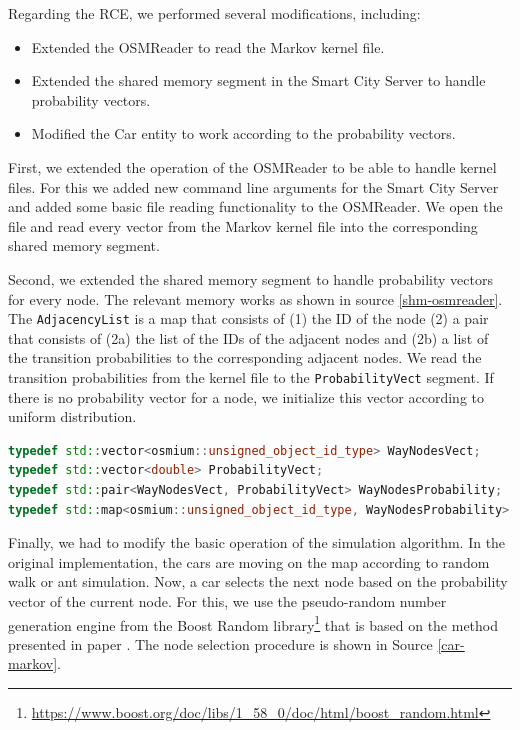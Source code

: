 \documentclass[b5paper,12pt]{report}
\theoremstyle{definition}
\begin{document}
Regarding the RCE, we performed several modifications, including:
\begin{itemize}
    \item Extended the OSMReader to read the Markov kernel file.
    \item Extended the shared memory segment in the Smart City Server to handle probability vectors.
    \item Modified the Car entity to work according to the probability vectors.
\end{itemize} 

First, we extended the operation of the OSMReader to be able to handle kernel files. For this we added new command line arguments for the Smart City Server and added some basic file reading functionality to the OSMReader. We open the file and read every vector from the Markov kernel file into the corresponding shared memory segment.

Second, we extended the shared memory segment to handle probability vectors for every node. The relevant memory works as shown in source \ref{shm-osmreader}. The \texttt{AdjacencyList} is a map that consists of (1) the ID of the node (2) a pair that consists of (2a) the list of the IDs of the adjacent nodes and (2b) a list of the transition probabilities to the corresponding adjacent nodes. We read the transition probabilities from the kernel file to the \texttt{ProbabilityVect} segment. If there is no probability vector for a node, we initialize this vector according to uniform distribution.

\begin{lstlisting}[language=C++,caption=The shared memory segment of a Markov traffic., label=shm-osmreader, escapechar={|}]
typedef std::vector<osmium::unsigned_object_id_type> WayNodesVect;
typedef std::vector<double> ProbabilityVect;
typedef std::pair<WayNodesVect, ProbabilityVect> WayNodesProbability;
typedef std::map<osmium::unsigned_object_id_type, WayNodesProbability> AdjacencyList;
\end{lstlisting}

Finally, we had to modify the basic operation of the simulation algorithm. In the original implementation, the cars are moving on the map according to random walk or ant simulation. Now, a car selects the next node based on the probability vector of the current node. For this, we use the pseudo-random number generation engine from the Boost Random library\footnote{\url{https://www.boost.org/doc/libs/1_58_0/doc/html/boost_random.html}} that is based on the method presented in paper \cite{Matsumoto}. The node selection procedure is shown in Source \ref{car-markov}.
\end{document}

